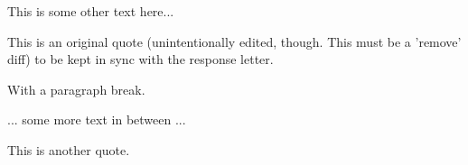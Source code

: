 
This is some other text here...


This is an original quote (unintentionally edited, though. This must be a
'remove' diff) to be kept in sync with the response letter.

With a paragraph break.


... some more text in between ...

This is another quote.

